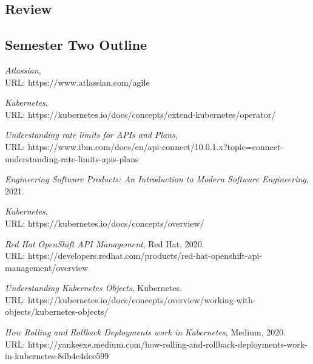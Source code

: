 \documentclass{article}
\begin{document}
\subsection{Review}



\subsection{Semester Two Outline}




\clearpage
\begin{thebibliography}{9}


\emph{Atlassian}, \\URL: https://www.atlassian.com/agile 

\emph{Kubernetes}, \\URL: https://kubernetes.io/docs/concepts/extend-kubernetes/operator/

\emph{Understanding rate limits for APIs and Plans}, \\URL: https://www.ibm.com/docs/en/api-connect/10.0.1.x?topic=connect-understanding-rate-limits-apis-plans

\emph{Engineering Software Products: An Introduction to Modern Software Engineering}, 2021.
  
\emph{Kubernetes}, \\URL: https://kubernetes.io/docs/concepts/overview/  

\emph{Red Hat OpenShift API Management}, Red Hat, 2020. \\URL: https://developers.redhat.com/products/red-hat-openshift-api-management/overview

\emph{Understanding Kubernetes Objects}, Kubernetes. \\URL: https://kubernetes.io/docs/concepts/overview/working-with-objects/kubernetes-objects/
  
\emph{How Rolling and Rollback Deployments work in Kubernetes}, Medium, 2020. \\URL: https://yankeexe.medium.com/how-rolling-and-rollback-deployments-work-in-kubernetes-8db4c4dce599 


\end{thebibliography}
\end{document}
